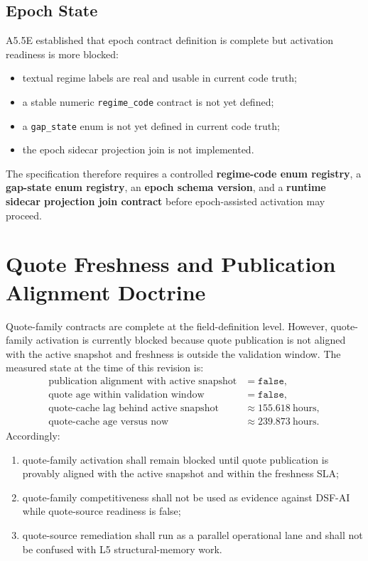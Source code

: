\subsection{Epoch State}
A5.5E established that epoch contract definition is complete but activation readiness is more blocked:
\begin{itemize}
    \item textual regime labels are real and usable in current code truth;
    \item a stable numeric \texttt{regime\_code} contract is not yet defined;
    \item a \texttt{gap\_state} enum is not yet defined in current code truth;
    \item the epoch sidecar projection join is not implemented.
\end{itemize}
The specification therefore requires a controlled \textbf{regime-code enum registry}, a \textbf{gap-state enum registry}, an \textbf{epoch schema version}, and a \textbf{runtime sidecar projection join contract} before epoch-assisted activation may proceed.

\section{Quote Freshness and Publication Alignment Doctrine}

Quote-family contracts are complete at the field-definition level. However, quote-family activation is currently blocked because quote publication is not aligned with the active snapshot and freshness is outside the validation window. The measured state at the time of this revision is:
\begin{align*}
\text{publication alignment with active snapshot} &= \texttt{false},\\
\text{quote age within validation window} &= \texttt{false},\\
\text{quote-cache lag behind active snapshot} &\approx 155.618\ \text{hours},\\
\text{quote-cache age versus now} &\approx 239.873\ \text{hours}.
\end{align*}
Accordingly:
\begin{enumerate}[leftmargin=1.2cm]
    \item quote-family activation shall remain blocked until quote publication is provably aligned with the active snapshot and within the freshness SLA;
    \item quote-family competitiveness shall not be used as evidence against DSF-AI while quote-source readiness is false;
    \item quote-source remediation shall run as a parallel operational lane and shall not be confused with L5 structural-memory work.
\end{enumerate}


